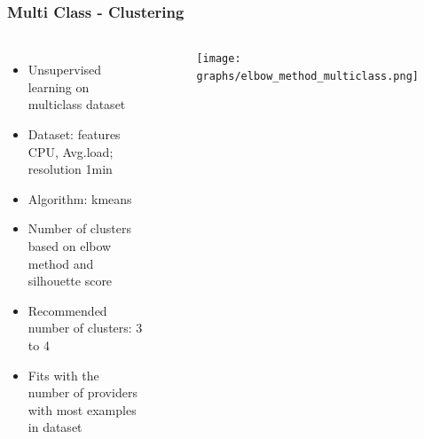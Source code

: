 \documentclass[aspectratio=169,11pt,hyperref={colorlinks=true}]{beamer}
\begin{document}
\begin{frame}
    \frametitle{Multi Class - Clustering}
    \begin{columns}
      \begin{itemize}
          \item{Unsupervised learning on multiclass dataset}
          \item{Dataset: features CPU, Avg.load; resolution 1min}
          \item{Algorithm: kmeans}
          \item{Number of clusters based on elbow method and silhouette score}
          \item{Recommended number of clusters: 3 to 4}
          \item{Fits with the number of providers with most examples in dataset}
      \end{itemize}
        \begin{center}
          \begin{table}[h!]
            \begin{center}
            \end{center}
         \end{table}
         \begin{figure}
           \texttt{[image: graphs/elbow\_method\_multiclass.png]}
          \end{figure}
        \end{center}
  \end{columns}
\end{frame}
\end{document}
